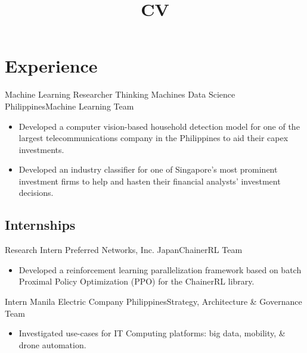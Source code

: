 \documentclass[11pt,a4paper,sans]{moderncv}
\title{CV}
\begin{document}
\maketitle

\section{Experience}
        {Machine Learning Researcher}
        {Thinking Machines Data Science}
        {Philippines}{Machine Learning Team}
        {
            \begin{itemize}
                \item Developed a computer vision-based household detection
                    model for one of the largest telecommunications company in
                    the Philippines to aid their capex investments.
                \item Developed an industry classifier for one of Singapore's
                    most prominent investment firms to help and hasten their
                    financial analysts' investment decisions.
            \end{itemize}
        }

\subsection{Internships}

        {Research Intern}
        {Preferred Networks, Inc.}
        {Japan}{ChainerRL Team}
        {
            \begin{itemize} 
                \item Developed a reinforcement learning parallelization
                    framework based on batch Proximal Policy Optimization (PPO)
                    for the ChainerRL library.
            \end{itemize}
        }

        {Intern}
        {Manila Electric Company}
        {Philippines}{Strategy, Architecture \& Governance Team}
        {
            \begin{itemize}
                \item Investigated use-cases for IT Computing platforms: big
                    data, mobility, \& drone automation.
            \end{itemize}
        }
\end{document}
